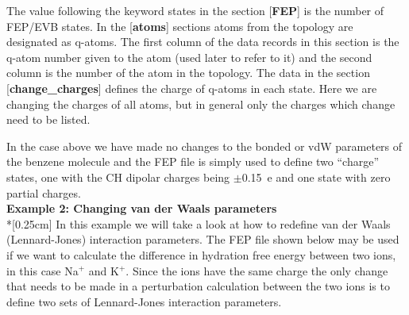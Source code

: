 \documentclass[a4paper,10pt]{article}
\begin{document}
The value following  the keyword states in  the section [\textbf{FEP}]
is  the number  of FEP/EVB  states. In  the [\textbf{atoms}]  sections
atoms from the topology are designated as q-atoms. The first column of
the data  records in this  section is the  q-atom number given  to the
atom (used later to  refer to it) and the second  column is the number
of   the  atom   in   the   topology.   The   data   in  the   section
[\textbf{change{\_}charges}]  defines the  charge of  q-atoms in  each
state. Here we  are changing the charges of all  atoms, but in general
only the charges which change need to be listed.

In  the case  above we  have  made no  changes  to the  bonded or  vdW
parameters of the benzene molecule and  the FEP file is simply used to
define two  ``charge'' states, one  with the CH dipolar  charges being
$\pm $0.15~e and one state with zero partial charges.\\


\textbf{Example 2: Changing van der Waals parameters}\\*[0.25cm] In
this example we will take a look at how to redefine van der Waals
(Lennard-Jones) interaction parameters. The FEP file shown below
may be used if we want to calculate the difference in hydration
free energy between two ions, in this case Na$^{+}$ and K$^{+}$.
Since the ions have the same charge the only change that needs to
be made in a perturbation calculation between the two ions is to
define two sets of Lennard-Jones interaction parameters.

\setcounter{table}{3}
\end{document}
